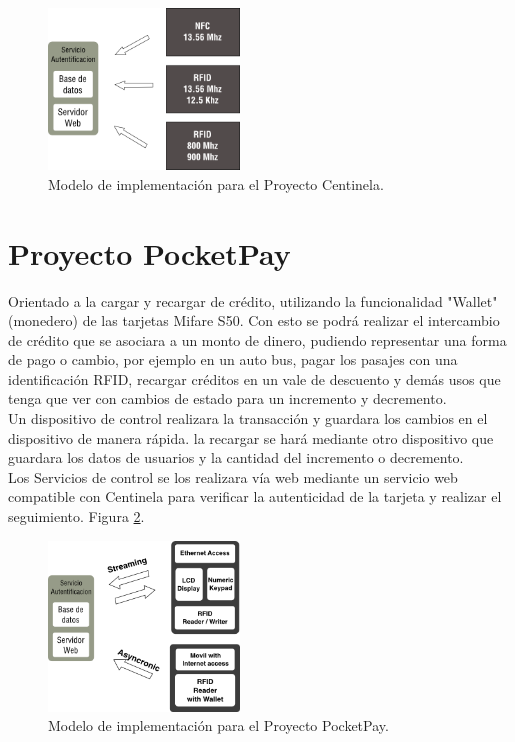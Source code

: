 \documentclass[11pt,twocolumn]{article}
\begin{document}
\begin{figure}[!h]
  \begin{center}
    \includegraphics[width=2in]{architect.png}
  \end{center}

  \caption{\small Modelo de implementaci\'on para el Proyecto Centinela.}
  \label{fig-centinela}
\end{figure}

\section{Proyecto PocketPay}

Orientado a la cargar y recargar de cr\'edito, utilizando la funcionalidad 
"Wallet" (monedero) de las tarjetas Mifare S50. Con esto se podr\'a realizar 
el intercambio de cr\'edito que se asociara a un monto de dinero, pudiendo 
representar una forma de pago o cambio, por ejemplo en un auto bus, pagar 
los pasajes con una identificaci\'on RFID, recargar cr\'editos en un vale 
de descuento y dem\'as usos que tenga que ver con cambios de estado para un 
incremento y decremento.\\

Un dispositivo de control realizara la transacci\'on y guardara los cambios en 
el dispositivo de manera r\'apida. la recargar se har\'a mediante  otro 
dispositivo que guardara los datos de usuarios y la cantidad del incremento 
o decremento.\\

Los Servicios de control se los realizara v\'ia web mediante un servicio web 
compatible con Centinela para verificar la autenticidad de la tarjeta y 
realizar el seguimiento. Figura \ref{fig-pocketpay}.\\

\begin{figure}[!h]
  \begin{center}
    \includegraphics[width=2in]{pocketpay.png}
  \end{center}

  \caption{\small Modelo de implementaci\'on para el Proyecto PocketPay.}
  \label{fig-pocketpay}
\end{figure}
\end{document}
